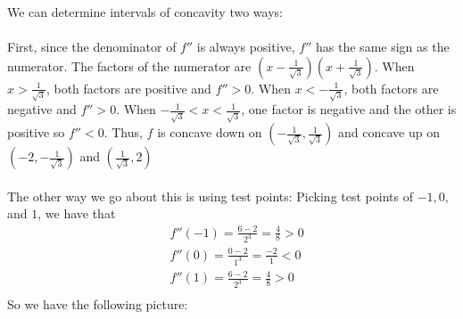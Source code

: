 \documentclass[nooutcomes]{ximera}
\begin{document}
\begin{problem}
\begin{enumerate}
\begin{freeResponse}
		We can determine intervals of concavity two ways:\\\\
		First, since the denominator of $f''$ is always positive, $f''$ has the same sign as the numerator.  The factors of the numerator are $\left(x- \frac{1}{\sqrt{3}} \right) \left(x+ \frac{1}{\sqrt{3}} \right) $.  When $x>\frac{1}{\sqrt{3}}$, both factors are positive and $f''>0$.  When $x<-\frac{1}{\sqrt{3}}$, both factors are negative and $f''>0$.  When $-\frac{1}{\sqrt{3}}<x<\frac{1}{\sqrt{3}}$, one factor is negative and the other is positive so $f''<0$. Thus, $f$ is concave down on $\left( - \frac{1}{\sqrt{3}}, \frac{1}{\sqrt{3}} \right)$ and concave up on $\left( -2, - \frac{1}{\sqrt{3}} \right)$ and $ \left( \frac{1}{\sqrt{3}}, 2 \right)$\\\\
		
		The other way we go about this is using test points:
		Picking test points of $-1, 0, $ and $1$, we have that
		\begin{align*}
		& f''(-1) = \frac{6-2}{2^3} = \frac{4}{8} > 0 \\
		& f''(0) = \frac{0-2}{1^3} = \frac{-2}{1} < 0 \\
		& f''(1) = \frac{6-2}{2^3} = \frac{4}{8} > 0 \\
		\end{align*}
		So we have the following picture:
		
		
\begin{center}
\begin{image}
\end{image}
\end{center}
\end{freeResponse}
\end{enumerate}
\end{problem}
\end{document}

